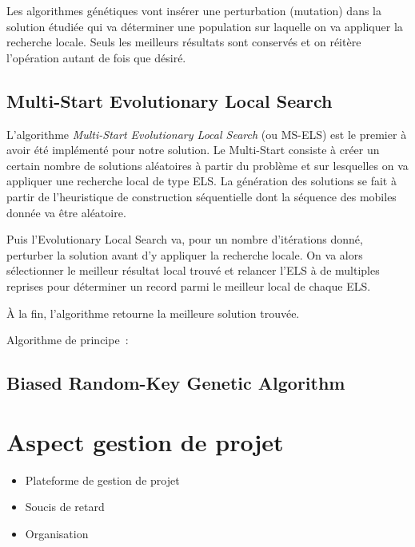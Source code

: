 	Les algorithmes génétiques vont insérer une perturbation (mutation) dans la solution étudiée qui va déterminer une population sur laquelle on va appliquer la recherche locale. Seuls les meilleurs résultats sont conservés et on réitère l'opération autant de fois que désiré.

		\subsection{Multi-Start Evolutionary Local Search}

		L'algorithme \emph{Multi-Start Evolutionary Local Search} (ou MS-ELS) est le premier  à avoir été implémenté pour notre solution. Le Multi-Start consiste à créer un certain nombre de solutions aléatoires à partir du problème et sur lesquelles on va appliquer une recherche local de type ELS. La génération des solutions se fait à partir de l'heuristique de construction séquentielle dont la séquence des mobiles donnée va être aléatoire.

		Puis l'Evolutionary Local Search va, pour un nombre d'itérations donné, perturber la solution avant d'y appliquer la recherche locale. On va alors sélectionner le meilleur résultat local trouvé et relancer l'ELS à de multiples reprises pour déterminer un record parmi le meilleur local de chaque ELS.

		À la fin, l'algorithme retourne la meilleure solution trouvée.

		Algorithme de principe :
		\begin{code}
				\begin{algo}[informal]
					\BEGIN
									\ENDIF
								\ENDFOR
								\ENDIF
							\ENDFOR
						\ENDFOR
					\END
				\end{algo}
			\end{code}


		\subsection{Biased Random-Key Genetic Algorithm}
	\section{Aspect gestion de projet}

	\begin{itemize}
		\item Plateforme de gestion de projet
		\item Soucis de retard
		\item Organisation
	\end{itemize}
